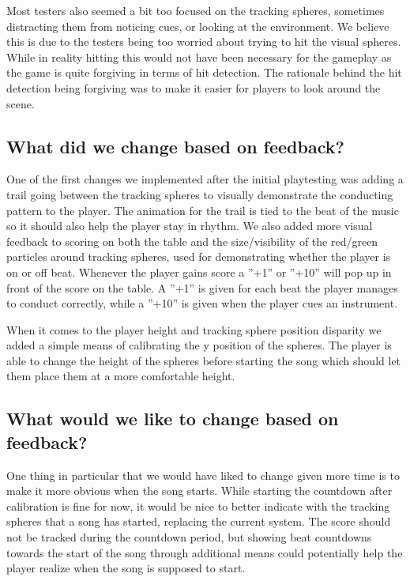 Most testers also seemed a bit too focused on the tracking spheres, sometimes distracting them from noticing cues, or looking at the environment. We believe this is due to the testers being too worried about trying to hit the visual spheres. While in reality hitting this would not have been necessary for the gameplay as the game is quite forgiving in terms of hit detection. The rationale behind the hit detection being forgiving was to make it easier for players to look around the scene.

\subsection{What did we change based on feedback?}
One of the first changes we implemented after the initial playtesting was adding a trail going between the tracking spheres to visually demonstrate the conducting pattern to the player. The animation for the trail is tied to the beat of the music so it should also help the player stay in rhythm. We also added more visual feedback to scoring on both the table and the size/visibility of the red/green particles around tracking spheres, used for demonstrating whether the player is on or off beat. Whenever the player gains score a ''+1'' or ''+10'' will pop up in front of the score on the table. A ''+1'' is given for each beat the player manages to conduct correctly, while a ''+10'' is given when the player cues an instrument.

When it comes to the player height and tracking sphere position disparity we added a simple means of calibrating the y position of the spheres. The player is able to change the height of the spheres before starting the song which should let them place them at a more comfortable height. 

\subsection{What would we like to change based on feedback?}
One thing in particular that we would have liked to change given more time is to make it more obvious when the song starts. While starting the countdown after calibration is fine for now, it would be nice to better indicate with the tracking spheres that a song has started, replacing the current system. The score should not be tracked during the countdown period, but showing beat countdowns towards the start of the song through additional means could potentially help the player realize when the song is supposed to start. 


